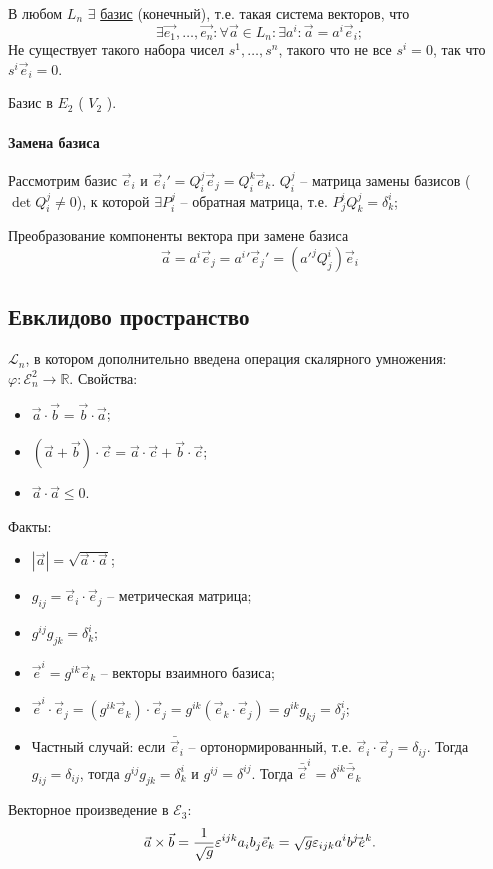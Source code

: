В любом $L_n$ $\exists$ \underline{базис} (конечный), т.е. такая система векторов, что
\[
  \exists \vec{e_1}, \dots, \vec{e_n}: \forall \vec{a} \in L_n: \exists a^i :  \vec{a} = a^i \vec{e}_i;
\]
Не существует такого набора чисел $s^1, \dots, s^n$, такого что не все $s^i = 0$, так что
$s^i \vec{e}_i = 0$.

\begin{ex}
  Базис в $E_2$ ( $V_2$ ). 
\end{ex}

\paragraph{Замена базиса}

Рассмотрим базис $\vec{e}_i$ и $\vec{e}_i' = Q_i^j \vec{e}_j = Q^k_i \vec{e}_k$. $Q^j_i$ -- матрица 
замены базисов ($\det Q^j_i \neq 0$), к которой $\exists P^j_i$ -- обратная матрица, т.е. $P^i_j Q^j_k = \delta^i_k$; 

Преобразование компоненты вектора при замене базиса
\[
  \vec{a} = a^i \vec{e}_j = a^i' \vec{e}_j' = (a'^j Q^i_j) \vec{e}_i
\]

\subsection{Евклидово пространство}

\begin{definition}
  $\mathcal{L}_n$, в котором дополнительно введена операция скалярного умножения: $\varphi: \mathcal{E}_n^2 \to \mathbb{R}$. 
  Свойства:
  \begin{itemize}
    \item $\vec{a} \cdot \vec{b} = \vec{b} \cdot \vec{a}$;
    \item $(\vec{a}+\vec{b}) \cdot \vec{c} = \vec{a} \cdot \vec{c} + \vec{b} \cdot \vec{c}$;
    \item $\vec{a} \cdot \vec{a} \leqslant 0$.
  \end{itemize}
  
  Факты:
  \begin{itemize}
    \item $|\vec{a}| = \sqrt{ \vec{a} \cdot \vec{a}}$;
    \item $g_{ij} = \vec{e}_i \cdot \vec{e}_j$ -- метрическая матрица;
    \item $g^{ij} g_{jk} = \delta^i_k$;
    \item $\vec{e}^i = g^{ik} \vec{e}_k$ -- векторы взаимного базиса;
    \item $\vec{e}^i \cdot \vec{e}_j = (g^{ik} \vec{e}_k) \cdot \vec{e}_j = g^{ik} (\vec{e}_k \cdot \vec{e}_j) = g^{ik} g_{kj} = \delta^i_j$;
    \item Частный случай: если $\bar{\vec{e}}_i$ -- ортонормированный, т.е.
      $\vec{e}_i \cdot \vec{e}_j = \delta_{ij}$. Тогда $g_{ij} = \delta_{ij}$, тогда
      $g^{ij} g_{jk} = \delta^i_k$ и $g^{ij} = \delta^{ij}$. Тогда $\bar{\vec{e}}^i = \delta^{ik} \bar{\vec{e}}_k$
  \end{itemize}
\end{definition}

Векторное произведение в $\mathcal{E}_3$:
\[
  \vec{a} \times \vec{b} = \dfrac{1}{\sqrt{g}} \varepsilon^{ijk} a_i b_j \vec{e}_k
  = \sqrt{g} \varepsilon_{ijk} a^i b^j \skew{-7}\vec{e}^k.
\]

